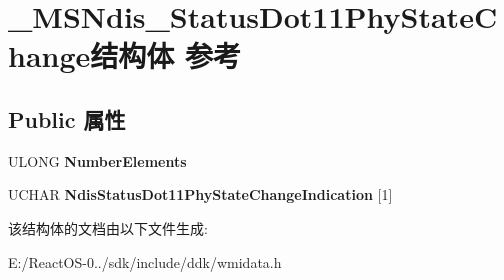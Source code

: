 \hypertarget{struct___m_s_ndis___status_dot11_phy_state_change}{}\section{\+\_\+\+M\+S\+Ndis\+\_\+\+Status\+Dot11\+Phy\+State\+Change结构体 参考}
\label{struct___m_s_ndis___status_dot11_phy_state_change}
\subsection*{Public 属性}
\begin{DoxyCompactItemize}
\item 
\mbox{\label{struct___m_s_ndis___status_dot11_phy_state_change_a240390ca6119bea08cfae4b8d709c390}} 
U\+L\+O\+NG {\bfseries Number\+Elements}
\item 
\mbox{\label{struct___m_s_ndis___status_dot11_phy_state_change_ac8eeca8a3f9353f73d3a9f36b69717c7}} 
U\+C\+H\+AR {\bfseries Ndis\+Status\+Dot11\+Phy\+State\+Change\+Indication} \mbox{[}1\mbox{]}
\end{DoxyCompactItemize}


该结构体的文档由以下文件生成\+:\begin{DoxyCompactItemize}
\item 
E\+:/\+React\+O\+S-\/0../sdk/include/ddk/wmidata.\+h\end{DoxyCompactItemize}
